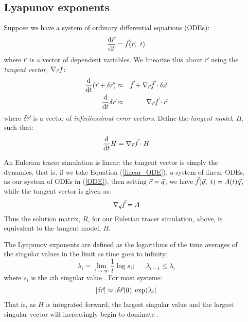 \documentclass{article}
\begin{document}
\subsection{Lyapunov exponents}

Suppose we have a system of ordinary differential equations (ODEs):
\begin{equation}
	\frac{\mathrm d \vec r}{\mathrm d t} = \vec f(\vec r, ~ t)
	\label{ODE}
\end{equation}
where $\vec r$ is a vector of dependent variables.
We linearize this about $\vec r$ using the {\it tangent vector},
$\nabla_{\vec r} f$:
\begin{eqnarray}
\frac{\mathrm d}{\mathrm d t} (\vec r + \delta \vec r) & \approx & \vec f + 
	\nabla_{\vec r} \vec f \cdot \delta \vec x \\
	\frac{\mathrm d}{\mathrm d t} \delta \vec r & \approx & \nabla_{\vec r} \vec f \cdot \vec r
\end{eqnarray}
where $\delta \vec r$ is a vector of {\it infinitessimal error vectors}.
Define the {\it tangent model}, $H$, such that:
\begin{equation} 
	\frac{\mathrm d}{\mathrm d t} H = \nabla_{\vec r} \vec f \cdot H \\
\end{equation}

An Eulerian tracer simulation is linear: the tangent vector is simply
the dynamics, that is,
if we take Equation (\ref{linear_ODE}), a system of linear ODEs,
as our system of ODEs in
(\ref{ODE}), then setting $\vec r=\vec q$, 
we have $\vec f(\vec q, ~t)=A(t) \vec q$,
while the tangent vector is given as:
\begin{equation}
	\nabla_{\vec q} \vec f = A
\end{equation}
Thus the solution matrix, $R$, for our Eulerian tracer simulation, above,
is equivalent to the tangent model, $H$.

The Lyapunov exponents are defined as the logarithms of the time averages
of the singular values in the limit as time goes to infinity:
\begin{equation}
\lambda_i = \lim_{t \rightarrow \infty} \frac{1}{t} \log s_i;
~~~~~~~\lambda_{i-1} \le \lambda_i
\end{equation}
where $s_i$ is the $i$th singular value \citep{Ott1993}.
For most systems:
\begin{equation}
|\delta \vec r| \approx |\delta \vec r(0) | \exp(\lambda_i)
\label{lambda1}
\end{equation}
That is, as $H$ is integrated forward, the largest singular value and
the largest singular vector will increasingly begin to dominate
\citep{Ott1993}.
\end{document}
